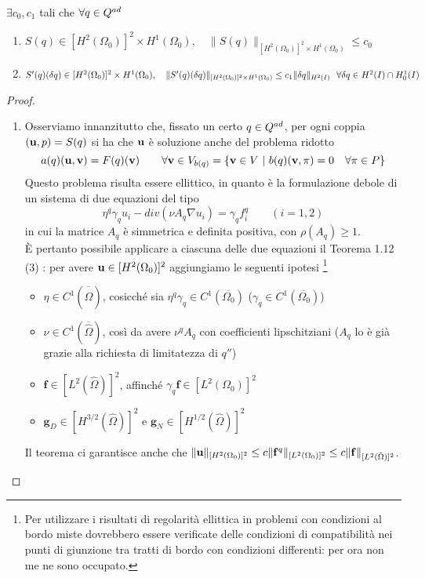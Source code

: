 \begin{teor}
	$\exists c_0,c_1$ tali che $\forall q\in Q^{ad}$
	\begin{enumerate}
		\item $S(q)\in[H^2(\Omega_0)]^2\times H^1(\Omega_0),\quad \|S(q)\|_{[H^2(\Omega_0)]^2\times H^1(\Omega_0)}\leq c_0$
		\item $S'(q)({\delta q})\in[H^2(\Omega_0)]^2\times H^1(\Omega_0),\quad \|S'(q)({\delta q})\|_{[H^2(\Omega_0)]^2\times H^1({\Omega_0})}\leq c_1\|{\delta q}\|_{H^2(I)}\ \ \forall{\delta q}\in H^2(I)\cap H^1_0(I)$
	\end{enumerate}
\label{th:regolaritaS}
\end{teor}
\begin{proof}
\begin{enumerate}
\item
Osserviamo innanzitutto che, fissato un certo $q\in Q^{ad}$, per ogni coppia $(\mathbf{u},p)=S(q)$ si ha che $\mathbf{u}$ \`e soluzione anche del problema ridotto
\begin{equation}
	a(q)(\mathbf{u},\mathbf v) = F(q)(\mathbf v) \qquad \forall \mathbf v \in V_{b(q)}=\{\mathbf v \in V\ |\ b(q)(\mathbf v, \pi)=0\quad\forall\pi\in P\}
\label{eq:PR}
\end{equation}
Questo problema risulta essere ellittico, in quanto \`e la formulazione debole di un sistema di due equazioni del tipo
\begin{equation}
	\eta^q\gamma_q u_i - div(\nu A_q\nabla u_i) = \gamma_q f^q_i \qquad (i=1,2)
\label{eq:StokesT1i}
\end{equation}
in cui la matrice $A_q$ \`e simmetrica e definita positiva, con $\rho(A_q)\geq 1$.\\
\`E pertanto possibile applicare a ciascuna delle due equazioni il Teorema 1.12 (3) \cite{Kinigera}: per avere $\mathbf{u}\in[H^2(\Omega_0)]^2$ aggiungiamo le seguenti ipotesi \footnote{Per utilizzare i risultati di regolarità ellittica in problemi con condizioni al bordo miste dovrebbero essere verificate delle condizioni di compatibilità nei punti di giunzione tra tratti di bordo con condizioni differenti: per ora non me ne sono occupato.}
\begin{itemize}
	\item $\eta\in C^1(\overline{\hat{\Omega}})$, cosicch\'e sia $\eta^q\gamma_q\in C^1(\overline{\Omega_0})$ ($\gamma_q\in C^1(\overline{\Omega_0})$)
	\item $\nu\in C^1(\overline{\hat{\Omega}})$, cos\`i da avere $\nu^qA_q$ con coefficienti lipschitziani ($A_q$ lo \`e gi\`a grazie alla richiesta di limitatezza di $q''$)
	\item $\mathbf f \in[L^2(\hat{\Omega})]^2$, affinch\'e $\gamma_q\mathbf f\in [L^2(\Omega_0)]^2$
	\item $\mathbf g_D \in [H^{3/2}(\hat{\Omega})]^2$ e $\mathbf g_N \in [H^{1/2}(\hat{\Omega})]^2$
\end{itemize}
Il teorema ci garantisce anche che $\|\mathbf{u}\|_{[H^2(\Omega_0)]^2}\leq c\|\mathbf f^q\|_{[L^2(\Omega_0)]^2}\leq c\|\mathbf f\|_{[L^2(\hat{\Omega})]^2}$.\\



\end{enumerate}
\end{proof}

